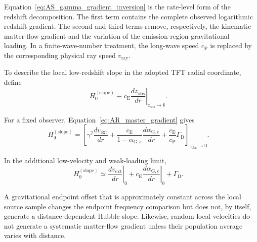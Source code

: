 Equation~\eqref{eq:AS_gamma_gradient_inversion} is the rate-level form of the
redshift decomposition. The first term contains the complete observed
logarithmic redshift gradient. The second and third terms remove,
respectively, the kinematic matter-flow gradient and the variation of the
emission-region gravitational loading. In a finite-wave-number treatment,
the long-wave speed \(c_{\mathrm P}\) is replaced by the corresponding
physical ray speed \(v_{\mathrm{ray}}\).

To describe the local low-redshift slope in the adopted TFT radial coordinate,
define
\begin{equation}
    \boxed{
    H_0^{(\mathrm{slope})}
    \equiv
    c_{\mathrm E}
    \left.
    \frac{
        dz_{\mathrm{obs}}
    }{
        dr
    }
    \right|_{z_{\mathrm{obs}}\rightarrow0}.
    }
    \label{eq:AS_H0_slope_definition}
\end{equation}

For a fixed observer, Equation~\eqref{eq:AR_master_gradient} gives
\begin{equation}
    \boxed{
    H_0^{(\mathrm{slope})}
    =
    \left[
        \gamma^2
        \frac{
            dv_{\mathrm{ext}}
        }{
            dr
        }
        +
        \frac{
            c_{\mathrm E}
        }{
            1-\alpha_{\mathrm G,e}
        }
        \frac{
            d\alpha_{\mathrm G,e}
        }{
            dr
        }
        +
        \frac{
            c_{\mathrm E}
        }{
            c_{\mathrm P}
        }
        \Gamma_{\mathrm D}
    \right]_{z_{\mathrm{obs}}\rightarrow0}.
    }
    \label{eq:AS_H0_slope_budget}
\end{equation}

In the additional low-velocity and weak-loading limit,
\begin{equation}
    \boxed{
    H_0^{(\mathrm{slope})}
    \simeq
    \left.
    \frac{
        dv_{\mathrm{ext}}
    }{
        dr
    }
    \right|_0
    +
    c_{\mathrm E}
    \left.
    \frac{
        d\alpha_{\mathrm G,e}
    }{
        dr
    }
    \right|_0
    +
    \Gamma_{\mathrm D}.
    }
    \label{eq:AS_H0_slope_weak_limit}
\end{equation}

A gravitational endpoint offset that is approximately constant across the
local source sample changes the endpoint frequency comparison but does not,
by itself, generate a distance-dependent Hubble slope. Likewise, random local
velocities do not generate a systematic matter-flow gradient unless their
population average varies with distance.

